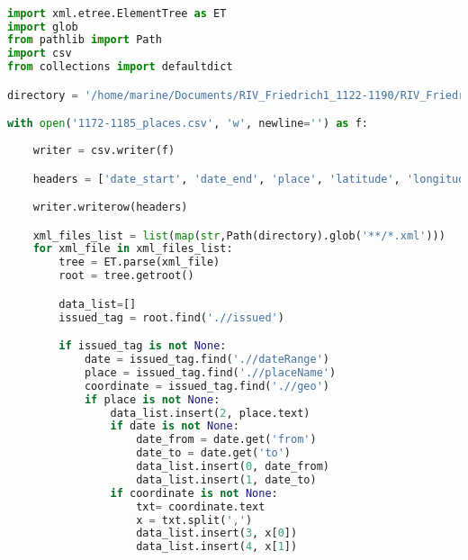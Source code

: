 \lstset{style=mystyle}
\begin{lstlisting}[language=Python]

import xml.etree.ElementTree as ET
import glob
from pathlib import Path
import csv
from collections import defaultdict

directory = '/home/marine/Documents/RIV_Friedrich1_1122-1190/RIV_Friedrich1_1172-1185'

with open('1172-1185_places.csv', 'w', newline='') as f:
    
    writer = csv.writer(f)

    headers = ['date_start', 'date_end', 'place', 'latitude', 'longitude']

    writer.writerow(headers)

    xml_files_list = list(map(str,Path(directory).glob('**/*.xml')))
    for xml_file in xml_files_list:
        tree = ET.parse(xml_file)
        root = tree.getroot()

        data_list=[]
        issued_tag = root.find('.//issued')

        if issued_tag is not None:
            date = issued_tag.find('.//dateRange')
            place = issued_tag.find('.//placeName')
            coordinate = issued_tag.find('.//geo')
            if place is not None:
                data_list.insert(2, place.text)
                if date is not None:
                    date_from = date.get('from')
                    date_to = date.get('to')
                    data_list.insert(0, date_from)
                    data_list.insert(1, date_to)
                if coordinate is not None:
                    txt= coordinate.text
                    x = txt.split(',')
                    data_list.insert(3, x[0])
                    data_list.insert(4, x[1])

\end{lstlisting}